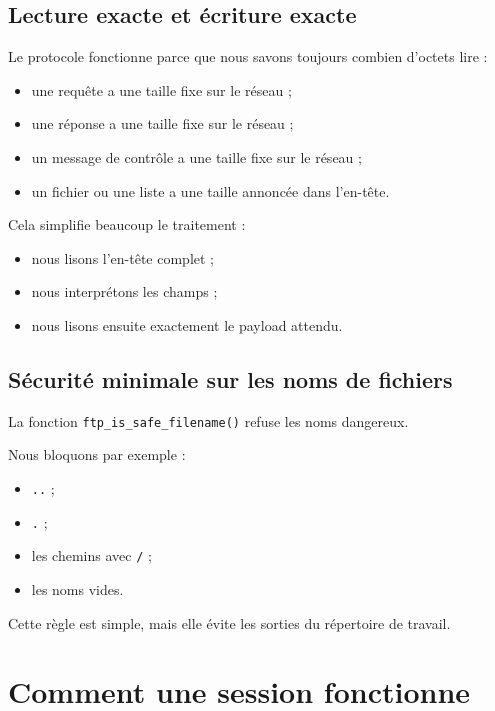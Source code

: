 \documentclass[a4paper,11pt]{article}
\begin{document}
\subsection{Lecture exacte et écriture exacte}

Le protocole fonctionne parce que nous savons toujours combien d'octets lire :

\begin{itemize}[leftmargin=*]
    \item une requête a une taille fixe sur le réseau ;
    \item une réponse a une taille fixe sur le réseau ;
    \item un message de contrôle a une taille fixe sur le réseau ;
    \item un fichier ou une liste a une taille annoncée dans l'en-tête.
\end{itemize}

Cela simplifie beaucoup le traitement :

\begin{itemize}[leftmargin=*]
    \item nous lisons l'en-tête complet ;
    \item nous interprétons les champs ;
    \item nous lisons ensuite exactement le payload attendu.
\end{itemize}

\subsection{Sécurité minimale sur les noms de fichiers}

La fonction \texttt{ftp\_is\_safe\_filename()} refuse les noms dangereux.

Nous bloquons par exemple :

\begin{itemize}[leftmargin=*]
    \item \texttt{..} ;
    \item \texttt{.} ;
    \item les chemins avec \texttt{/} ;
    \item les noms vides.
\end{itemize}

Cette règle est simple, mais elle évite les sorties du répertoire de travail.
\newpage
\section{Comment une session fonctionne}
\end{document}
